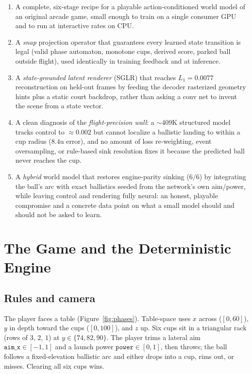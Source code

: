 \documentclass[11pt]{article}
\newcommand{\code}[1]{\texttt{#1}}
\begin{document}
\begin{enumerate}
    \item A complete, six-stage recipe for a playable action-conditioned world model of an original arcade game, small enough to train on a single consumer GPU and to run at interactive rates on CPU.
    \item A \emph{snap} projection operator that guarantees every learned state transition is legal (valid phase automaton, monotone cups, derived score, parked ball outside flight), used identically in training feedback and at inference.
    \item A \emph{state-grounded latent renderer} (SGLR) that reaches $L_1 = 0.0077$ reconstruction on held-out frames by feeding the decoder rasterized geometry hints plus a static court backdrop, rather than asking a conv net to invent the scene from a state vector.
    \item A clean diagnosis of the \emph{flight-precision wall}: a $\sim$409K structured model tracks control to $\approx 0.002$ but cannot localize a ballistic landing to within a cup radius ($8.4$u error), and no amount of loss re-weighting, event oversampling, or rule-based sink resolution fixes it because the predicted ball never reaches the cup.
    \item A \emph{hybrid} world model that restores engine-parity sinking ($6/6$) by integrating the ball's arc with exact ballistics seeded from the network's own aim/power, while leaving control and rendering fully neural: an honest, playable compromise and a concrete data point on what a small model should and should not be asked to learn.
\end{enumerate}

\section{The Game and the Deterministic Engine}

\subsection{Rules and camera}

The player faces a table (Figure~\ref{fig:phases}). Table-space uses $x$ across ($[0,60]$), $y$ in depth toward the cups ($[0,100]$), and $z$ up. Six cups sit in a triangular rack (rows of $3$, $2$, $1$) at $y\in\{74,82,90\}$. The player trims a lateral aim $\code{aim\_x}\in[-1,1]$ and a launch power $\code{power}\in[0,1]$, then throws; the ball follows a fixed-elevation ballistic arc and either drops into a cup, rims out, or misses. Clearing all six cups wins.
\end{document}
